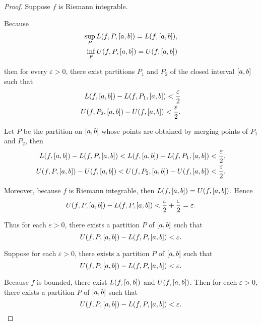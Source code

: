 \begin{proof}
    Suppose $f$ is Riemann integrable.

    Because
    \[
        \begin{split}
            \sup\limits_{P} L(f, P, \left[{a, b}\right]) = L(f, \left[{a, b}\right]), \\
            \inf\limits_{P} U(f, P, \left[{a, b}\right]) = U(f, \left[{a, b}\right])
        \end{split}
    \]

    then for every $\varepsilon > 0$, there exist partitions $P_{1}$ and $P_{2}$ of the closed interval $\left[{a, b}\right]$ such that
    \[
        \begin{split}
            L(f, \left[{a, b}\right]) - L(f, P_{1}, \left[{a, b}\right]) < \frac{\varepsilon}{2} \\
            U(f, P_{2}, \left[{a, b}\right]) - U(f, \left[{a, b}\right]) < \frac{\varepsilon}{2}.
        \end{split}
    \]

    Let $P$ be the partition on $\left[{a, b}\right]$ whose points are obtained by merging points of $P_{1}$ and $P_{2}$, then
    \[
        \begin{split}
            L(f, \left[{a, b}\right]) - L(f, P, \left[{a, b}\right]) < L(f, \left[{a, b}\right]) - L(f, P_{1}, \left[{a, b}\right]) < \frac{\varepsilon}{2}, \\
            U(f, P, \left[{a, b}\right]) - U(f, \left[{a, b}\right]) < U(f, P_{2}, \left[{a, b}\right]) - U(f, \left[{a, b}\right]) < \frac{\varepsilon}{2}.
        \end{split}
    \]

    Moreover, because $f$ is Riemann integrable, then $L(f, \left[{a, b}\right]) = U(f, \left[{a, b}\right])$. Hence
    \[
        U(f, P, \left[{a, b}\right]) - L(f, P, \left[{a, b}\right]) < \frac{\varepsilon}{2} + \frac{\varepsilon}{2} = \varepsilon.
    \]

    Thus for each $\varepsilon > 0$, there exists a partition $P$ of $\left[{a, b}\right]$ such that
    \[
        U(f, P, \left[{a,b}\right]) - L(f, P, \left[{a,b}\right]) < \varepsilon.
    \]

    \bigskip
    Suppose for each $\varepsilon > 0$, there exists a partition $P$ of $\left[{a, b}\right]$ such that
    \[
        U(f, P, \left[{a,b}\right]) - L(f, P, \left[{a,b}\right]) < \varepsilon.
    \]

    Because $f$ is bounded, there exist $L(f, \left[{a, b}\right])$ and $U(f, \left[{a, b}\right])$.
    Then for each $\varepsilon > 0$, there exists a partition $P$ of $\left[{a, b}\right]$ such that
    \[
        U(f, P, \left[{a,b}\right]) - L(f, P, \left[{a,b}\right]) < \varepsilon.
    \]


\end{proof}
